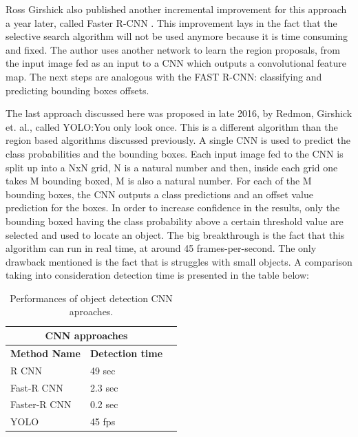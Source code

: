 \documentclass[12pt,a4paper,twoside]{report}
\begin{document}
Ross Girshick also published another incremental improvement for this approach a year later, called Faster R-CNN \cite{article-fasterrcnn}. This improvement lays in the fact that the selective search algorithm will not be used anymore because it is time consuming and fixed. The author uses another network to learn the region proposals, from the input image fed as an input to a CNN which outputs a convolutional feature map. The next steps are analogous with the FAST R-CNN: classifying and predicting bounding boxes offsets.\par
The last approach discussed here was proposed in late 2016, by Redmon, Girshick et. al., called YOLO:You only look once\cite{article-yolo}. This is a different algorithm than the region based algorithms discussed previously. A single CNN is used to predict the class probabilities and the bounding boxes. Each input image fed to the CNN is split up into a NxN grid, N is a natural number and then, inside each grid one takes M bounding boxed, M is also a natural number. For each of the M bounding boxes, the CNN outputs a class predictions and an offset value prediction for the boxes. In order to increase confidence in the results, only the bounding boxed having the class probability above a certain threshold value are selected and used to locate an object. The big breakthrough is the fact that this algorithm can run in real time, at around 45 frames-per-second. The only drawback mentioned is the fact that is struggles with small objects. A comparison taking into consideration detection time is presented in the table below:\par
\begin{table}[h!]
\centering
\begin{tabular}{ |p{3cm}||p{3cm}|p{3cm}| }
 \hline
 \multicolumn{2}{|c|}{\textbf{CNN approaches}} \\
 \hline
 \textbf{Method Name} & \textbf{Detection time} \\
 \hline
  R CNN & 49 sec\\
 \hline
  Fast-R CNN & 2.3 sec\\
 \hline
 Faster-R CNN & 0.2 sec\\
 \hline
 YOLO & 45 fps\\
 \hline
\end{tabular}
\caption{Performances of object detection CNN aproaches.}
\end{table}\par
\end{document}
